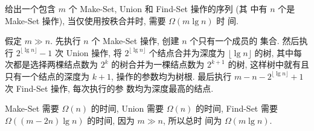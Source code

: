 \documentclass[boxes]{homework}
\begin{document}
\begin{problem}
给出一个包含 $m$ 个 {\sc Make-Set}, {\sc Union} 和 {\sc Find-Set} 操作的序列 (其
中有 $n$ 个是 {\sc Make-Set} 操作), 当仅使用按秩合并时, 需要 $\Omega(m\lg n)$ 时
间.
\end{problem}
\begin{solution}
    假定 $m \gg n$. 先执行 $n$ 个 {\sc Make-Set} 操作, 创建 $n$ 个只有一个成员的
    集合. 然后执行 $2^{\lfloor \lg n \rfloor} - 1$ 次 {\sc Union} 操作, 将
    $2^{\lfloor \lg n \rfloor}$ 个结点合并为深度为 $\lfloor \lg n \rfloor$ 的树,
    其中每次都是选择两棵结点数为 $2^{k}$ 的树合并为一棵结点数为 $2^{k+1}$ 的树,
    这样树中就有且只有一个结点的深度为 $k + 1$, 操作的参数均为树根. 最后执行
    $m - n - 2^{\lfloor \lg n \rfloor} + 1$ 次 {\sc Find-Set} 操作, 每次执行的参
    数均为深度最高的结点.

    {\sc Make-Set} 需要 $\Omega(n)$ 的时间, {\sc Union} 需要 $\Omega(n)$ 的时间,
    {\sc Find-Set} 需要 $\Omega((m - 2n)\lg n)$ 的时间, 因为 $m \gg n$, 所以总时
    间为 $\Omega(m\lg n)$.
\end{solution}
\end{document}
